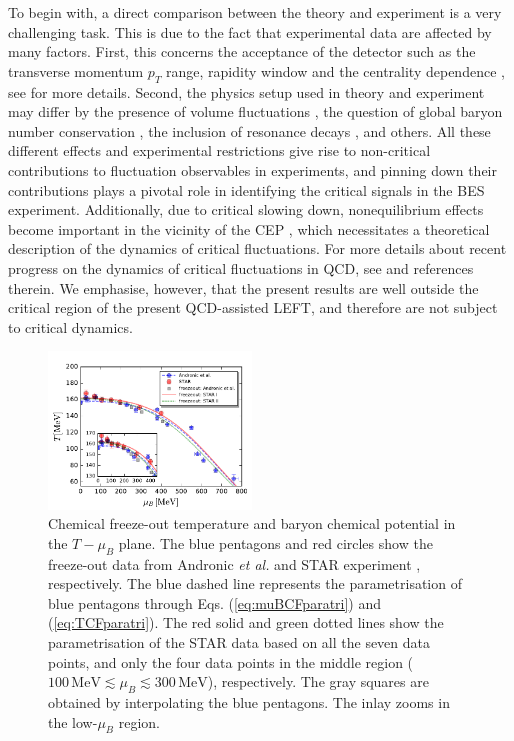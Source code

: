 \documentclass[%
reprint,
superscriptaddress,
showpacs,preprintnumbers,
amsmath,amssymb,
aps,
prd,
]{revtex4-1}
\begin{document}
To begin with, a direct comparison between the theory and experiment is a very  challenging task. This is due to the fact that experimental data are affected by many factors. First, this concerns the acceptance of the detector such as the transverse momentum $p_T$ range, rapidity window and the centrality dependence \cite{Adamczyk:2013dal,Luo:2015ewa,Adam:2020unf,Nonaka:2020crv,Pandav:2020uzx}, see \cite{Luo:2017faz,Adamczyk:2017iwn} for more details. Second, the physics setup used in theory and experiment may differ by the presence of volume fluctuations \cite{Luo:2013bmi}, the question of global baryon number conservation \cite{Braun-Munzinger:2016yjz,Vovchenko:2020tsr}, the inclusion of resonance decays \cite{Nahrgang:2014fza}, and others. All these different effects and experimental restrictions give rise to  non-critical contributions to fluctuation observables in experiments, and pinning down their contributions plays a pivotal role in identifying the critical signals in the BES experiment. Additionally, due to critical slowing down, nonequilibrium effects become important in the vicinity of the CEP \cite{Berdnikov:1999ph}, which necessitates a theoretical description of the dynamics of critical fluctuations. For more details about recent progress on the dynamics of critical fluctuations in QCD, see \cite{Bluhm:2020mpc} and references therein. We emphasise, however, that the present results are well outside the critical region of the present QCD-assisted LEFT, and therefore are not subject to critical dynamics. 

%
\begin{figure}[t]
\includegraphics[width=0.48\textwidth]{phasediagram}
\caption{Chemical freeze-out temperature and baryon chemical potential in the $T-\mu_B$ plane. The blue pentagons and red circles show the freeze-out data from Andronic {\it et al.} \cite{Andronic:2017pug} and STAR experiment \cite{Adamczyk:2017iwn}, respectively. The blue dashed line represents the parametrisation of blue pentagons through Eqs. (\ref{eq:muBCFparatri}) and (\ref{eq:TCFparatri}). The red solid and green dotted lines show the parametrisation of the STAR data based on all the seven data points, and only the four data points in the middle region ($100\,\mathrm{MeV}\lesssim\mu_B\lesssim 300\,\mathrm{MeV}$), respectively. The gray squares are obtained by interpolating the blue pentagons. The inlay zooms in the low-$\mu_B$ region.}\label{fig:phasediagram}
\end{figure}
%
\end{document}
